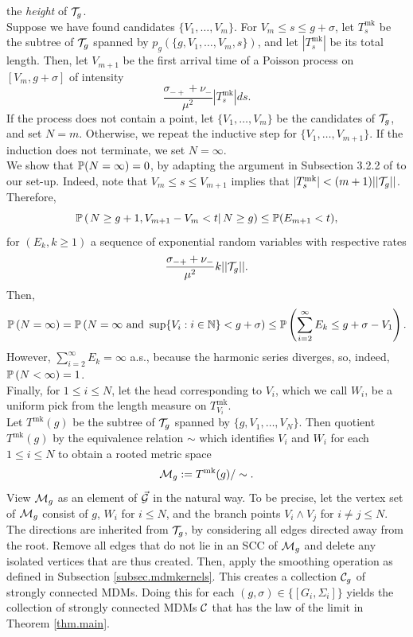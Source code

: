 the \emph{height} of $\cT_g$. \\
Suppose we have found candidates $\{V_1,\dots,V_m\}$. For $V_m\leq s\leq g+\sigma$, let $T^{\mathrm{mk}}_s$ be the subtree of $\cT_g$ spanned by $p_g\left(\{g,V_1,\dots,V_m,s\}\right)$, and let $|T^{\mathrm{mk}}_s|$ be its total length. Then, let $V_{m+1}$ be the first arrival time of a Poisson process on $[V_m,g+\sigma]$ of intensity $$\frac{\sigma_{-+}+\nu_-}{\mu^2}|T^{\mathrm{mk}}_s|ds.$$ If the process does not contain a point, let $\{V_1,\dots,V_m\}$ be the candidates of $\cT_g$, and set $N=m$. Otherwise, we repeat the inductive step for $\{V_1,\dots,V_{m+1}\}.$ If the induction does not terminate, we set $N=\infty$.\\
We show that $\P(N=\infty)=0$, by adapting the argument in Subsection 3.2.2 of \cite{goldschmidtScalingLimitCritical2021} to our set-up. Indeed, note that $V_m\leq s\leq V_{m+1}$ implies that  $|T^{\mathrm{mk}}_s|<(m+1)||\cT_g||$. Therefore, 
$$\P\left(\left.N\geq g+1,V_{m+1}-V_m<t \right|N\geq g\right)\leq \P(E_{m+1}<t),$$
for $(E_{k},k\geq 1)$ a sequence of exponential random variables with respective rates $$\frac{\sigma_{-+}+\nu_-}{\mu^2}k||\cT_g||.$$ 
Then,
$$\P\left(N=\infty \right)=\P\left(N=\infty\text{ and }\sup\{V_i:i\in \N\}<g+\sigma\right)\leq \P\left(\sum_{i=2}^\infty E_k\leq g+\sigma-V_1\right).$$
However, $\sum_{i=2}^\infty E_k=\infty$ a.s., because the harmonic series diverges, so, indeed, $\P\left(N<\infty \right)=1$. \\
Finally, for $1\leq i \leq N$, let the head corresponding to $V_i$, which we call $W_i$, be a uniform pick from the length measure on $T^{\mathrm{mk}}_{V_i}$. \\
Let $T^{\mathrm{mk}}(g)$ be the subtree of $\cT_{g}$ spanned by $\{g,V_1,\dots,V_N\}$. Then quotient $T^{\mathrm{mk}}(g)$ by the equivalence relation $\sim$ which identifies  $V_i$ and $W_i$ for each $1\leq i\leq N$ to obtain a rooted metric space $$\cM_{g}:=T^{\mathrm{mk}}(g)/\sim.$$ 
View $\cM_{g}$ as an element of $\vec{\cG}$ in the natural way. To be precise,  let the vertex set of $\cM_g$ consist of $g$, $W_i$ for $i\leq N$, and the branch points $V_i\wedge V_j$ for $i\neq j\leq N$. The directions are inherited from $\cT_g$, by considering all edges directed away from the root. Remove all edges that do not lie in an SCC of $\cM_{g}$ and delete any isolated vertices that are thus created. Then, apply the smoothing operation as defined in Subsection \ref{subsec.mdmkernels}. This creates a collection $\cC_g$ of strongly connected MDMs. Doing this for each $(g,\sigma)\in \{[G_i,\Sigma_i]\}$ yields the collection of strongly connected MDMs $\cC$ that has the law of the limit in Theorem \ref{thm.main}.


